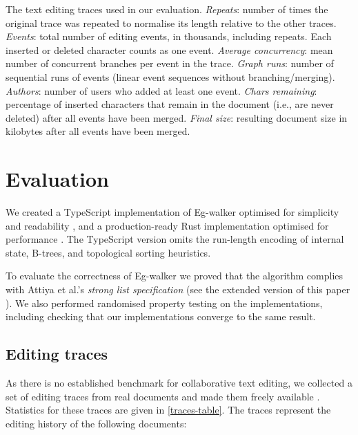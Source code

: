 \documentclass[sigplan,10pt]{acmart}
\newif\ifincludeappendix
\newcommand{\algname}{Eg-walker\xspace}
\begin{document}
\begin{table}
  \caption{The text editing traces used in our evaluation.
    \emph{Repeats}: number of times the original trace was repeated to normalise its length relative to the other traces.
    \emph{Events}: total number of editing events, in thousands, including repeats. Each inserted or deleted character counts as one event.
    \emph{Average concurrency}: mean number of concurrent branches per event in the trace.
    \emph{Graph runs}: number of sequential runs of events (linear event sequences without branching/merging).
    \emph{Authors}: number of users who added at least one event.
    \emph{Chars remaining}: percentage of inserted characters that remain in the document (i.e., are never deleted) after all events have been merged.
    \emph{Final size}: resulting document size in kilobytes after all events have been merged.
  }
  \label{traces-table}
  \footnotesize
\end{table}

\section{Evaluation}\label{benchmarking}


We created a TypeScript implementation of \algname optimised for simplicity and readability \cite{reference-reg}, and a production-ready Rust implementation optimised for performance \cite{dt}.
The TypeScript version omits the run-length encoding of internal state, B-trees, and topological sorting heuristics.

To evaluate the correctness of \algname we proved that the algorithm complies with Attiya et al.'s \emph{strong list specification} \cite{Attiya2016} (see \ifincludeappendix\autoref{proofs}\else the extended version of this paper \cite{extended-version}\fi).
We also performed randomised property testing on the implementations, including checking that our implementations converge to the same result.

\subsection{Editing traces}\label{editing-traces}

As there is no established benchmark for collaborative text editing, we collected a set of editing traces from real documents and made them freely available \cite{editing-traces}.
Statistics for these traces are given in \autoref{traces-table}.
The traces represent the editing history of the following documents:
\end{document}
